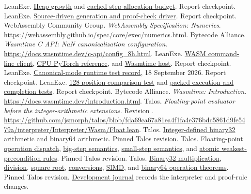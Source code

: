 \documentclass[11pt]{article}
\newcommand{\longcode}[1]{\texttt{\seqsplit{#1}}}
\newcommand{\src}[2]{\href{https://github.com/jsmorph/leanexe/blob/4360920c3060d1c625b1860229b5116804d177c8/#1}{#2}}
\newcommand{\talossrc}[2]{\href{https://github.com/jsmorph/talos/blob/87e3aa5e8f6e6f3b3eb5e7e4c5aba43071002d47/#1}{#2}}
\begin{document}
\begin{thebibliography}{99}
 LeanExe.  \src{proofs/talos/lean/Project/ProofKit/HeapGrowth.lean}{Heap growth} and \src{proofs/talos/lean/Project/Gpt2CachedStep/Entry/Budget.lean}{cached-step allocation budget}.  Report checkpoint.
 LeanExe.  \src{tools/talos-lib.js}{Source-driven generation and proof-check driver}.  Report checkpoint.
 WebAssembly Community Group.  \emph{WebAssembly Specification: Numerics}.  \url{https://webassembly.github.io/spec/core/exec/numerics.html}.
 Bytecode Alliance.  \emph{Wasmtime C API: NaN canonicalization configuration}.  \url{https://docs.wasmtime.dev/c-api/config_8h.html}.
 LeanExe.  \src{training/gpt2/wasm.py}{WASM command-line client}, \src{training/gpt2/reference.py}{CPU PyTorch reference}, and \src{tools/wasmtime-host.c}{Wasmtime host}.  Report checkpoint.
 LeanExe.  \src{data/gpt2-124m/canonical-mode-test.json}{Canonical-mode runtime test record}, 18 September 2026.  Report checkpoint.
 LeanExe.  \src{training/gpt2/test_wasm.py}{128-position comparison test} and \src{test/packed.js}{packed execution and completion tests}.  Report checkpoint.
 Bytecode Alliance.  \emph{Wasmtime: Introduction}.  \url{https://docs.wasmtime.dev/introduction.html}.
 Talos.  \emph{Floating-point evaluator before the integer-arithmetic extensions}.  Revision \longcode{fda69ca67a81ea4f1fa4e376bdc5861d9fe5479a}.  \url{https://github.com/jsmorph/talos/blob/fda69ca67a81ea4f1fa4e376bdc5861d9fe5479a/interpreter/Interpreter/Wasm/Float.lean}.
 Talos.  \talossrc{interpreter/Interpreter/Wasm/IEEE32.lean}{Integer-defined binary32 arithmetic} and \talossrc{interpreter/Interpreter/Wasm/IEEE64.lean}{binary64 arithmetic}.  Pinned Talos revision.
 Talos.  \talossrc{interpreter/Interpreter/Wasm/Float.lean}{Floating-point operation dispatch}, \talossrc{interpreter/Interpreter/Wasm/Semantics.lean}{big-step semantics}, \talossrc{interpreter/Interpreter/Wasm/SmallStep.lean}{small-step semantics}, and \talossrc{interpreter/Interpreter/Wasm/Wp/Atomic.lean}{atomic weakest-precondition rules}.  Pinned Talos revision.
 Talos.  \talossrc{codelib/CodeLib/IEEE32/Multiplication.lean}{Binary32 multiplication}, \talossrc{codelib/CodeLib/IEEE32/Division.lean}{division}, \talossrc{codelib/CodeLib/IEEE32/SquareRoot.lean}{square root}, \talossrc{codelib/CodeLib/IEEE32/Conversions.lean}{conversions}, \talossrc{codelib/CodeLib/IEEE32/SIMD.lean}{SIMD}, and \talossrc{codelib/CodeLib/IEEE64/Operations.lean}{binary64 operation theorems}.  Pinned Talos revision.  \talossrc{journal.md}{Development journal} records the interpreter and proof-rule changes.

\end{thebibliography}
\end{document}
